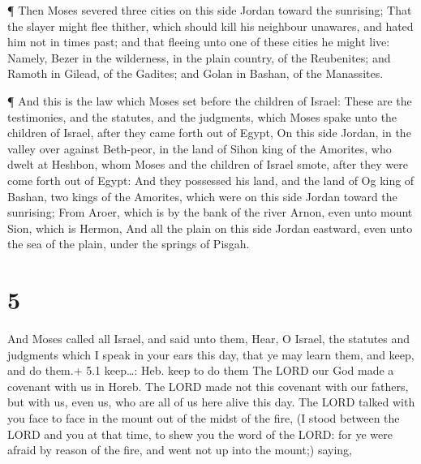  ¶ Then Moses severed three cities on this side Jordan
toward the sunrising;  That the slayer might flee thither,
which should kill his neighbour unawares, and hated him not in times
past; and that fleeing unto one of these cities he might live:
 Namely, Bezer in the wilderness, in the plain country, of
the Reubenites; and Ramoth in Gilead, of the Gadites; and Golan in
Bashan, of the Manassites.

 ¶ And this is the law which Moses set before the children
of Israel:  These are the testimonies, and the statutes,
and the judgments, which Moses spake unto the children of Israel, after
they came forth out of Egypt,  On this side Jordan, in the
valley over against Beth-peor, in the land of Sihon king of the
Amorites, who dwelt at Heshbon, whom Moses and the children of Israel
smote, after they were come forth out of Egypt:  And they
possessed his land, and the land of Og king of Bashan, two kings of the
Amorites, which were on this side Jordan toward the sunrising;
 From Aroer, which is by the bank of the river Arnon, even
unto mount Sion, which is Hermon,  And all the plain on
this side Jordan eastward, even unto the sea of the plain, under the
springs of Pisgah.

\hypertarget{section-4}{%
\section{5}\label{section-4}}

 And Moses called all Israel, and said unto them, Hear, O
Israel, the statutes and judgments which I speak in your ears this day,
that ye may learn them, and keep, and do them.+ 5.1 keep\ldots: Heb.
keep to do them  The LORD our God made a covenant with us in
Horeb.  The LORD made not this covenant with our fathers,
but with us, even us, who are all of us here alive this day.
 The LORD talked with you face to face in the mount out of
the midst of the fire,  (I stood between the LORD and you at
that time, to shew you the word of the LORD: for ye were afraid by
reason of the fire, and went not up into the mount;) saying,

